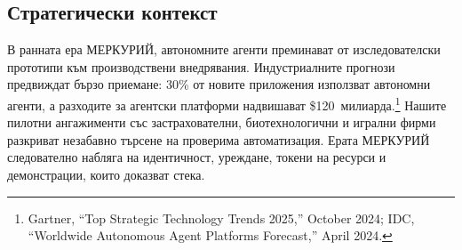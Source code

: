 \documentclass[11pt]{article}
\begin{document}
\subsection{Стратегически контекст}
В ранната ера МЕРКУРИЙ, автономните агенти преминават от изследователски прототипи към производствени внедрявания. Индустриалните прогнози предвиждат бързо приемане: 30\% от новите приложения използват автономни агенти, а разходите за агентски платформи надвишават \$120~милиарда.\footnote{Gartner, ``Top Strategic Technology Trends 2025,'' October 2024; IDC, ``Worldwide Autonomous Agent Platforms Forecast,'' April 2024.} Нашите пилотни ангажименти със застрахователни, биотехнологични и игрални фирми разкриват незабавно търсене на проверима автоматизация. Ерата МЕРКУРИЙ следователно набляга на идентичност, уреждане, токени на ресурси и демонстрации, които доказват стека.
\end{document}
